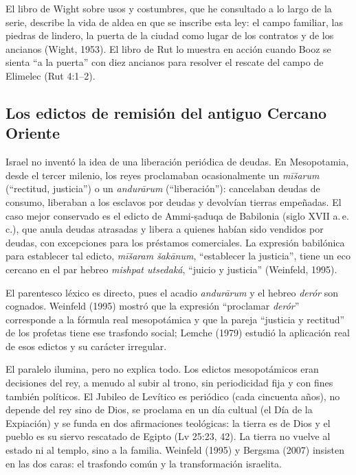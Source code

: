 \documentclass[11pt,letterpaper]{article}
\begin{document}
El libro de Wight sobre usos y costumbres, que he consultado a lo largo de la serie, describe la vida de aldea en que se inscribe esta ley: el campo familiar, las piedras de lindero, la puerta de la ciudad como lugar de los contratos y de los ancianos (Wight, 1953). El libro de Rut lo muestra en acción cuando Booz se sienta ``a la puerta'' con diez ancianos para resolver el rescate del campo de Elimelec (Rut 4:1--2).

\subsection{Los edictos de remisión del antiguo Cercano Oriente}
Israel no inventó la idea de una liberación periódica de deudas. En Mesopotamia, desde el tercer milenio, los reyes proclamaban ocasionalmente un \emph{mīšarum} (``rectitud, justicia'') o un \emph{andurārum} (``liberación''): cancelaban deudas de consumo, liberaban a los esclavos por deudas y devolvían tierras empeñadas. El caso mejor conservado es el edicto de Ammi-ṣaduqa de Babilonia (siglo XVII a.\,e.\,c.), que anula deudas atrasadas y libera a quienes habían sido vendidos por deudas, con excepciones para los préstamos comerciales. La expresión babilónica para establecer tal edicto, \emph{mīšaram šakānum}, ``establecer la justicia'', tiene un eco cercano en el par hebreo \emph{mishpat utsedaká}, ``juicio y justicia'' (Weinfeld, 1995).

El parentesco léxico es directo, pues el acadio \emph{andurārum} y el hebreo \emph{derór} son cognados. Weinfeld (1995) mostró que la expresión ``proclamar \emph{derór}'' corresponde a la fórmula real mesopotámica y que la pareja ``justicia y rectitud'' de los profetas tiene ese trasfondo social; Lemche (1979) estudió la aplicación real de esos edictos y su carácter irregular.

\begin{nota}
El paralelo ilumina, pero no explica todo. Los edictos mesopotámicos eran decisiones del rey, a menudo al subir al trono, sin periodicidad fija y con fines también políticos. El Jubileo de Levítico es periódico (cada cincuenta años), no depende del rey sino de Dios, se proclama en un día cultual (el Día de la Expiación) y se funda en dos afirmaciones teológicas: la tierra es de Dios y el pueblo es su siervo rescatado de Egipto (Lv 25:23, 42). La tierra no vuelve al estado ni al templo, sino a la familia. Weinfeld (1995) y Bergsma (2007) insisten en las dos caras: el trasfondo común y la transformación israelita.
\end{nota}
\end{document}
